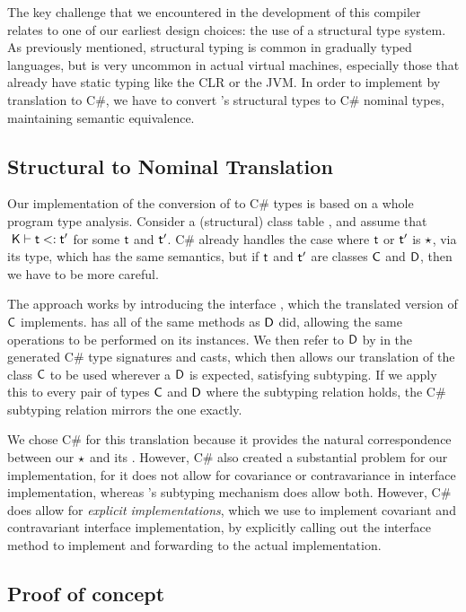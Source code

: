 \documentclass[acmlarge, anonymous, authordraft]{acmart}
\begin{document}
The key challenge that we encountered in the development of this compiler
relates to one of our earliest design choices: the use of a structural type
system. As previously mentioned, structural typing is common in gradually
typed languages, but is very uncommon in actual virtual machines, especially
those that already have static typing like the CLR or the JVM. In order to
implement \kafka by translation to C\#, we have to convert \kafka's structural
types to C\# nominal types, maintaining semantic equivalence.

\subsection{Structural to Nominal Translation} Our implementation of the
conversion of \kafka to C\# types is based on a whole program type analysis.
Consider a (structural) class table \K, and assume that $\StrSub{}\K\t\tp$ for
some $\t$ and $\tp$. C\# already handles the case where $\t$ or $\tp$ is
$\star$, via its  type, which has the same semantics, but if $\t$
and $\tp$ are classes ${\sf{C}}$ and ${\sf{D}}$, then we have to be more careful.

The approach works by introducing the interface , which the translated
version of ${\sf{C}}$ implements.  has all of the same methods as ${\sf{D}}$ did,
allowing the same operations to be performed on its instances. We then refer
to ${\sf{D}}$ by  in the generated C\# type signatures and casts, which then
allows our translation of the class ${\sf{C}}$ to be used wherever a ${\sf{D}}$ is
expected, satisfying subtyping. If we apply this to every pair of types ${\sf{C}}$
and ${\sf{D}}$ where the subtyping relation holds, the C\# subtyping relation
mirrors the \kafka one exactly.

We chose C\# for this translation because it provides the natural
correspondence between our $\star$ and its . However, C\# also
created a substantial problem for our implementation, for it does not allow
for covariance or contravariance in interface implementation, whereas \kafka's
subtyping mechanism does allow both. However, C\# does allow for
\emph{explicit implementations}, which we use to implement covariant and
contravariant interface implementation, by explicitly calling out the
interface method to implement and forwarding to the actual implementation.

\subsection{Proof of concept}
\end{document}
